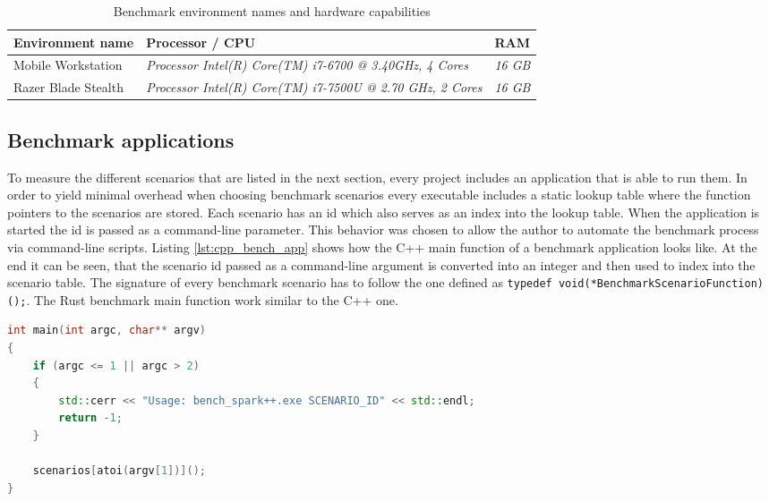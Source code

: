 \begin{table}[h!]
	\centering
	\label{my-label}
	\begin{tabular}{|l|l|l|}
		\hline
		\textbf{Environment name} & \textbf{Processor / CPU} & \textbf{RAM} \\ \hline
		Mobile Workstation	& \textit{Processor	Intel(R) Core(TM) i7-6700 @ 3.40GHz, 4 Cores} & \textit{16 GB} \\ \hline
		Razer Blade Stealth	& \textit{Processor	Intel(R) Core(TM) i7-7500U @ 2.70 GHz, 2 Cores} & \textit{16 GB} \\ \hline
	\end{tabular}
	\caption{Benchmark environment names and hardware capabilities}
\end{table}

\subsection{Benchmark applications}

To measure the different scenarios that are listed in the next section, every project includes an application that is able to run them. In order to yield minimal overhead when choosing benchmark scenarios every executable includes a static lookup table where the function pointers to the scenarios are stored. Each scenario has an id which also serves as an index into the lookup table. When the application is started the id is passed as a command-line parameter. This behavior was chosen to allow the author to automate the benchmark process via command-line scripts. Listing \ref{lst:cpp_bench_app} shows how the C++ main function of a benchmark application looks like. At the end it can be seen, that the scenario id passed as a command-line argument is converted into an integer and then used to index into the scenario table. The signature of every benchmark scenario has to follow the one defined as \texttt{typedef void(*BenchmarkScenarioFunction)();}. The Rust benchmark main function work similar to the C++ one.\\

\begin{lstlisting}[caption={Main function of the C++ benchmark app using a scenario lookup table}, label={lst:cpp_bench_app}, language={C++}]
int main(int argc, char** argv)
{
	if (argc <= 1 || argc > 2)
	{
		std::cerr << "Usage: bench_spark++.exe SCENARIO_ID" << std::endl;
		return -1;
	}
	
	scenarios[atoi(argv[1])]();
}
\end{lstlisting}


